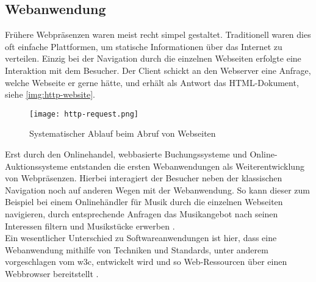\subsection{Webanwendung}
\label{sec:webanwendung}
Frühere Webpräsenzen waren meist recht simpel gestaltet. Traditionell waren dies oft einfache Plattformen, um statische Informationen über das Internet zu verteilen. Einzig bei der Navigation durch die einzelnen Webseiten erfolgte eine Interaktion mit dem Besucher. Der Client schickt an den Webserver eine Anfrage, welche Webseite er gerne hätte, und erhält als Antwort das HTML-Dokument, siehe \autoref{img:http-website}.

\begin{figure}[H]
	\begin{center}

		\texttt{[image: http-request.png]}
		\caption{Systematischer Ablauf beim Abruf von Webseiten}
		\label{img:http-website}
	\end{center}
\end{figure}

Erst durch den Onlinehandel, webbasierte Buchungssysteme und Online-Auktionssysteme entstanden die ersten Webanwendungen als Weiterentwicklung von Webpräsenzen. Hierbei interagiert der Besucher neben der klassischen Navigation noch auf anderen Wegen mit der Webanwendung. So kann dieser zum Beispiel bei einem Onlinehändler für Musik durch die einzelnen Webseiten navigieren, durch entsprechende Anfragen das Musikangebot nach seinen Interessen filtern und Musikstücke erwerben \cite[S. 89]{lid00}. \\
Ein wesentlicher Unterschied zu Softwareanwendungen ist hier, dass eine Webanwendung mithilfe von Techniken und Standards, unter anderem vorgeschlagen vom \ac{w3c}, entwickelt wird und so Web-Ressourcen über einen Webbrowser bereitstellt \cite[S. 2]{kap03}.



